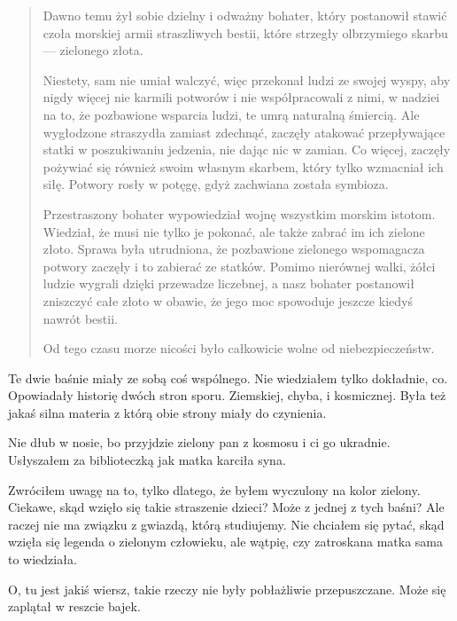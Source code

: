 \begin{sl}
\begin{quote}
	Dawno temu żył sobie dzielny i odważny bohater, który postanowił stawić czoła morskiej armii straszliwych bestii, które strzegły olbrzymiego skarbu --- zielonego złota.
	
	Niestety, sam nie umiał walczyć, więc przekonał ludzi ze swojej wyspy, aby nigdy więcej nie karmili potworów i nie współpracowali z nimi, w nadziei na to, że pozbawione wsparcia ludzi, te umrą naturalną śmiercią.
	Ale wygłodzone straszydła zamiast zdechnąć, zaczęły atakować przepływające statki w poszukiwaniu jedzenia, nie dając nic w zamian. Co więcej, zaczęły pożywiać się również swoim własnym skarbem, który tylko wzmacniał ich siłę. Potwory rosły w potęgę, gdyż zachwiana została symbioza.
	
	Przestraszony bohater wypowiedział wojnę wszystkim morskim istotom. Wiedział, że musi nie tylko je pokonać, ale także zabrać im ich zielone złoto.
	Sprawa była utrudniona, że pozbawione zielonego wspomagacza potwory zaczęły i to zabierać ze statków.
	Pomimo nierównej walki, żółci ludzie wygrali dzięki przewadze liczebnej, a nasz bohater postanowił zniszczyć całe złoto w obawie, że jego moc spowoduje jeszcze kiedyś nawrót bestii.
	
	Od tego czasu morze nicości było całkowicie wolne od niebezpieczeństw.
\end{quote}
\end{sl}

Te dwie baśnie miały ze sobą coś wspólnego. Nie wiedziałem tylko dokładnie, co. Opowiadały historię dwóch stron sporu. Ziemskiej, chyba, i kosmicznej.
Była też jakaś silna materia z którą obie strony miały do czynienia.

\begin{dialogue}
	\ds{} Nie dłub w nosie, bo przyjdzie zielony pan z kosmosu i ci go ukradnie. \dm{} Usłyszałem za biblioteczką jak matka karciła syna.
\end{dialogue}

Zwróciłem uwagę na to, tylko dlatego, że byłem wyczulony na kolor zielony.
Ciekawe, skąd wzięło się takie straszenie dzieci? Może z jednej z tych baśni? Ale raczej nie ma związku z gwiazdą, którą studiujemy.
Nie chciałem się pytać, skąd wzięła się legenda o zielonym człowieku, ale wątpię, czy zatroskana matka sama to wiedziała.

O, tu jest jakiś wiersz, takie rzeczy nie były pobłażliwie przepuszczane. Może się zaplątał w reszcie bajek.

